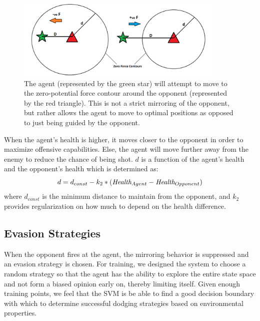 \documentclass{article}
\theoremstyle{plain}
\theoremstyle{definition}
\theoremstyle{remark}
\begin{document}
\begin{figure}[h]
	\centering
		\includegraphics[width= 10cm]{mirror}
		\caption{The agent (represented by the green star) will attempt to move to the zero-potential force contour around the opponent (represented by the red triangle). This is not a strict mirroring of the opponent, but rather allows the agent to move to optimal positions as opposed to just being guided by the opponent.}		
	\label{mirror}
\end{figure}

When the agent's health is higher, it moves closer to the opponent in order to maximize offensive capabilities. Else, the agent will move further away from the enemy to reduce the chance of being shot. $d$ is a function of the agent's health and the opponent's health which is determined as:
$$d = d_{const} - k_2*(\emph{Health}_{Agent} - \emph{Health}_{Opponent})$$
where $d_{const}$ is the minimum distance to maintain from the opponent, and $k_2$ provides regularization on how much to depend on the health difference.


\subsection*{Evasion Strategies}
When the opponent fires at the agent, the mirroring behavior is suppressed and an evasion strategy is chosen. For training, we designed the system to choose a random strategy so that the agent has the ability to explore the entire state space and not form a biased opinion early on, thereby limiting itself. Given enough training points, we feel that the SVM is be able to find a good decision boundary with which to determine successful dodging strategies based on environmental properties. 
\end{document}
